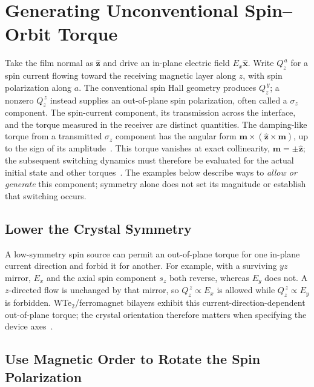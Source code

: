 \section{Generating Unconventional Spin--Orbit Torque}

Take the film normal as $\hat{\mathbf z}$ and drive an in-plane electric field
$E_x\hat{\mathbf x}$.  Write $Q_z^{\,a}$ for a spin current flowing toward the
receiving magnetic layer along $z$, with spin polarization along $a$.  The
conventional spin Hall geometry produces $Q_z^{\,y}$; a nonzero $Q_z^{\,z}$
instead supplies an out-of-plane spin polarization, often called a
$\sigma_z$ component.  The spin-current component, its transmission across the
interface, and the torque measured in the receiver are distinct quantities.
The damping-like torque from a transmitted $\sigma_z$ component has the angular
form $\mathbf m\times(\hat{\mathbf z}\times\mathbf m)$, up to the sign of its
amplitude~\cite{ee237-week11,sot-stt-compact-model,zhang2024revisiting}.
This torque vanishes at exact collinearity, $\mathbf m=\pm\hat{\mathbf z}$;
the subsequent switching dynamics must therefore be evaluated for the actual
initial state and other torques~\cite{zhang2024revisiting}.
The examples below describe ways to \emph{allow or generate} this component;
symmetry alone does not set its magnitude or establish that switching occurs.

\subsection{Lower the Crystal Symmetry}

A low-symmetry spin source can permit an out-of-plane torque for one in-plane
current direction and forbid it for another.  For example, with a surviving
$yz$ mirror, $E_x$ and the axial spin component $s_z$ both reverse, whereas
$E_y$ does not.  A $z$-directed flow is unchanged by that mirror, so
$Q_z^{\,z}\propto E_x$ is allowed while $Q_z^{\,z}\propto E_y$ is forbidden.
WTe$_2$/ferromagnet bilayers exhibit this current-direction-dependent
out-of-plane torque; the crystal orientation therefore matters when specifying
the device axes~\cite{ee237-week11,macneill2017wte2}.

\subsection{Use Magnetic Order to Rotate the Spin Polarization}

